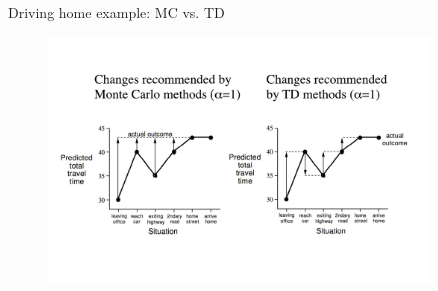 \bgroup
\begin{frame}{Driving home example: MC vs. TD}
\begin{figure}
\centering
\includegraphics[width=0.9\textwidth]{img/go_home_example.pdf}
\end{figure}
\end{frame}
\egroup